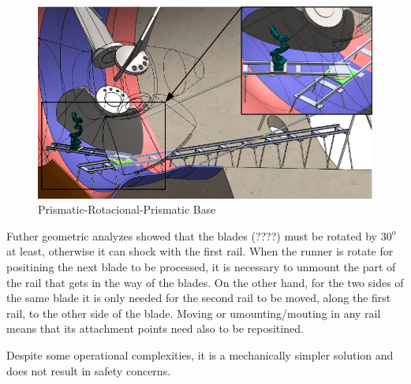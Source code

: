 \begin{figure}[h!]
   \centering
   \includegraphics[width=0.9\columnwidth]{figs/bases/base_prp}
   \caption{Prismatic-Rotacional-Prismatic Base}
   \label{fig::base_prp}
\end{figure}

  Futher geometric analyzes showed that the blades (????) must be rotated by
  $30^o$ at least, otherwise it can shock with the first rail. When the runner
  is rotate for positining the next blade to be processed, it is necessary to
  unmount the part of the rail that gets in the way of the blades. On the other
  hand, for the two sides of the same blade it is only needed for the second
  rail to be moved, along the first rail, to the other side of the blade.
  Moving or umounting/mouting in any rail means that its attachment points need
  also to be repositined. 
  
  Despite some operational complexities, it is a mechanically
  simpler solution and does not result in safety concerns.
  

